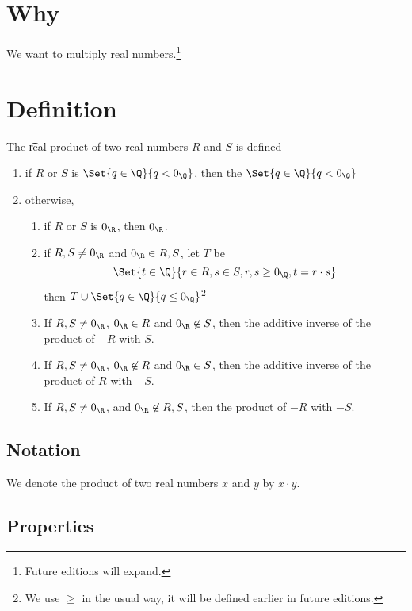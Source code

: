 

\section*{Why}

We want to multiply real numbers.\footnote{Future editions will expand.}

    \section*{Definition}


The \t{real product} of two real numbers $R$ and $S$ is defined
  \begin{enumerate}
    \item if $R$ or $S$ is $\Set{q \in \Q }{q < 0_{\Q }}$, then the $\Set{q \in \Q }{q < 0_{\Q }}$
    \item otherwise,
      \begin{enumerate}
        \item if $R$ or $S$ is $0_{\R }$, then $0_{\R }$.
        \item if $R,S \neq 0_{\R }$ and $0_{\R } \in R, S$, let $T$ be
\[
\Set{t \in \Q }{r \in R, s \in S, r, s \geq 0_{\Q }, t = r\cdot  s}
\]
then $T \cup \Set{q \in \Q }{q \leq 0_{\Q }}$\footnote{We use $\geq$ in the usual way, it will be defined earlier in future editions.}
        \item If $R, S \neq 0_{\R }$, $0_{\R } \in R$ and $0_{\R } \not\in S$, then the additive inverse of the product of $-R$ with $S$.
        \item If $R, S \neq 0_{\R }$, $0_{\R } \not\in R$ and $0_{\R } \in S$, then the additive inverse of the product of $R$ with $-S$.
        \item If $R, S \neq 0_{\R }$, and $0_{\R } \not\in R,S$, then the product of $-R$ with $-S$.
      \end{enumerate}
  \end{enumerate}

\subsection*{Notation}

We denote the product of two real numbers $x$ and $y$ by $x \cdot  y$.

\subsection*{Properties}

